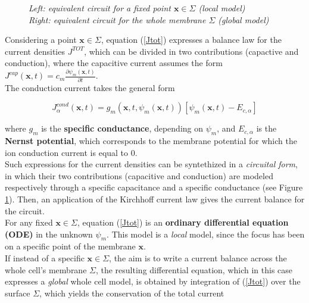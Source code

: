 \documentclass[12pt, a4paper]{article}
\begin{document}
\begin{figure}[H]
\begin{minipage}{\linewidth}
\begin{minipage}{0.48\linewidth}
\begin{figure}[H]
			\end{figure}
		\end{minipage}
		
	\end{minipage}
	\caption{\textit{Left: equivalent circuit for a fixed point $\textbf{x} \in \Sigma$ (local model)  \\
			Right: equivalent circuit for the whole membrane  $\Sigma$ (global model)}} \label{circuit}
\end{figure}


Considering  a point $\textbf{x} \in \Sigma$, equation (\ref*{Jtot}) expresses a balance law for the current densities $J^{TOT}$, which can be divided in two contributions (capactive and conduction), where the capacitive current assumes the form $J^{cap}(\textbf{x},t) = c_m \frac{\partial \psi_m(\textbf{x},t)}{\partial t}$.\\
The conduction current takes the general form 

\begin{equation}
J^{cond}_{\alpha}(\textbf{x},t) = g_m(\textbf{x},t,\psi_m(\textbf{x},t)) [\psi_m(\textbf{x},t) - E_{c,\alpha}] \label{conduction current}
\end{equation}

where $g_m$ is the \textbf{specific conductance}, depending on $\psi_m$, and $E_{c,\alpha}$ is the \textbf{Nernst potential}, which corresponds to the  membrane potential for which the ion conduction current is equal to $0$.\\
Such expressions for the current densities can be syntethized in a \textit{circuital form}, in which their two contributions (capacitive and conduction) are modeled respectively through a specific capacitance and a specific conductance (see Figure \ref{circuit}). Then, an application of the Kirchhoff current law  gives the current balance for the circuit.\\
For any fixed $\textbf{x} \in \Sigma$,  equation (\ref{Jtot}) is an \textbf{ordinary differential equation (ODE)} in the unknown $\psi_m$. This model is a \textit{local} model, since the focus has been on a specific point of the membrane $\textbf{x}$.
\\
If instead of a specific $\textbf{x} \in \Sigma$, the aim is to write a current balance across the whole cell's membrane $\Sigma$, the resulting differential equation, which in this case expresses a \textit{global} whole cell model, is obtained by integration of (\ref{Jtot})  over the surface $\Sigma$,  which yields the conservation of the total current 
\end{document}
